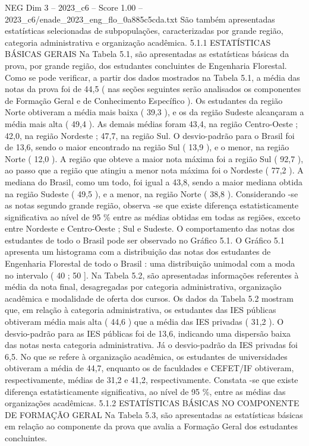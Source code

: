 \begin{textsample}{NEG Dim 3 – 2023\_c6 – Score 1.00 – 2023\_c6/enade\_2023\_eng\_flo\_0a885c5cda.txt}
São também apresentadas estatísticas selecionadas de subpopulações, caracterizadas por grande região, categoria administrativa e organização acadêmica. 5.1.1 ESTATÍSTICAS BÁSICAS GERAIS Na Tabela 5.1, são apresentadas as estatísticas básicas da prova, por grande região, dos estudantes concluintes de Engenharia Florestal.
Como se pode verificar, a partir dos dados mostrados na Tabela 5.1, a média das notas da prova foi de 44,5 ( nas seções seguintes serão analisados os componentes de Formação Geral e de Conhecimento Específico ).
Os estudantes da região Norte obtiveram a média mais baixa ( 39,3 ), e os da região Sudeste alcançaram a média mais alta ( 49,4 ).
As demais médias foram 43,4, na região Centro-Oeste ; 42,0, na região Nordeste ; 47,7, na região Sul.
O desvio-padrão para o Brasil foi de 13,6, sendo o maior encontrado na região Sul ( 13,9 ), e o menor, na região Norte ( 12,0 ).
A região que obteve a maior nota máxima foi a região Sul ( 92,7 ), ao passo que a região que atingiu a menor nota máxima foi o Nordeste ( 77,2 ).
A mediana do Brasil, como um todo, foi igual a 43,8, sendo a maior mediana obtida na região Sudeste ( 49,5 ), e a menor, na região Norte ( 38,8 ).
Considerando -se as notas segundo grande região, observa -se que existe diferença estatisticamente significativa ao nível de 95 \% entre as médias obtidas em todas as regiões, exceto entre Nordeste e Centro-Oeste ; Sul e Sudeste.
O comportamento das notas dos estudantes de todo o Brasil pode ser observado no Gráfico 5.1.
O Gráfico 5.1 apresenta um histograma com a distribuição das notas dos estudantes de Engenharia Florestal de todo o Brasil : uma distribuição unimodal com a moda no intervalo ( 40 ; 50 ].
Na Tabela 5.2, são apresentadas informações referentes à média da nota final, desagregadas por categoria administrativa, organização acadêmica e modalidade de oferta dos cursos.
Os dados da Tabela 5.2 mostram que, em relação à categoria administrativa, os estudantes das IES públicas obtiveram média mais alta ( 44,6 ) que a média das IES privadas ( 31,2 ).
O desvio-padrão para as IES públicas foi de 13,6, indicando uma dispersão baixa das notas nesta categoria administrativa.
Já o desvio-padrão da IES privadas foi 6,5.
No que se refere à organização acadêmica, os estudantes de universidades obtiveram a média de 44,7, enquanto os de faculdades e CEFET/IF obtiveram, respectivamente, médias de 31,2 e 41,2, respectivamente.
Constata -se que existe diferença estatisticamente significativa, ao nível de 95 \%, entre as médias das organizações acadêmicas. 5.1.2 ESTATÍSTICAS BÁSICAS NO COMPONENTE DE FORMAÇÃO GERAL Na Tabela 5.3, são apresentadas as estatísticas básicas em relação ao componente da prova que avalia a Formação Geral dos estudantes concluintes.

\end{textsample}
